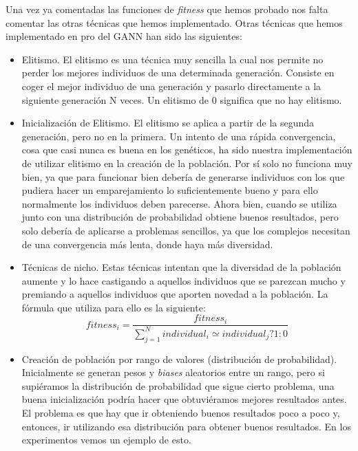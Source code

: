 \newpage
Una vez ya comentadas las funciones de \textit{fitness} que hemos probado nos falta comentar las otras técnicas que hemos implementado. Otras técnicas que hemos implementado en pro del GANN han sido las siguientes:

\begin{itemize}
    \item Elitismo. El elitismo es una técnica muy sencilla la cual nos permite no perder los mejores individuos de una determinada generación. Consiste en coger el mejor individuo de una generación y pasarlo directamente a la siguiente generación N veces. Un elitismo de 0 significa que no hay elitismo.
    \item Inicialización de Elitismo. El elitismo se aplica a partir de la segunda generación, pero no en la primera. Un intento de una rápida convergencia, cosa que casi nunca es buena en los genéticos, ha sido nuestra implementación de utilizar elitismo en la creación de la población. Por sí solo no funciona muy bien, ya que para funcionar bien debería de generarse individuos con los que pudiera hacer un emparejamiento lo suficientemente bueno y para ello normalmente los individuos deben parecerse. Ahora bien, cuando se utiliza junto con una distribución de probabilidad obtiene buenos resultados, pero solo debería de aplicarse a problemas sencillos, ya que los complejos necesitan de una convergencia más lenta, donde haya más diversidad.
    \item Técnicas de nicho. Estas técnicas intentan que la diversidad de la población aumente y lo hace castigando a aquellos individuos que se parezcan mucho y premiando a aquellos individuos que aporten novedad a la población. La fórmula que utiliza para ello es la siguiente:
        \[fitness_{i}=\dfrac{fitness_{i}}{\sum_{j=1}^{N}{individual_{i} \simeq  individual_{j} ? 1 : 0}}\]
    \item Creación de población por rango de valores (distribución de probabilidad). Inicialmente se generan pesos y \textit{biases} aleatorios entre un rango, pero si supiéramos la distribución de probabilidad que sigue cierto problema, una buena inicialización podría hacer que obtuviéramos mejores resultados antes. El problema es que hay que ir obteniendo buenos resultados poco a poco y, entonces, ir utilizando esa distribución para obtener buenos resultados. En los experimentos vemos un ejemplo de esto.
\end{itemize}

\newpage

